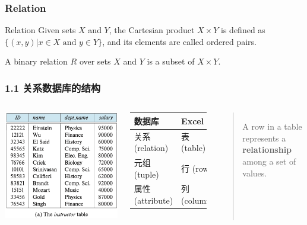 \documentclass[aspectratio=169, 14pt]{beamer}
\begin{document}
\begin{frame}
	\frametitle{Relation}

	\begin{exampleblock}{Relation}
		Given sets $X$ and $Y$, the Cartesian product $X \times Y$ is defined as $\{(x, y) | x \in X \text{ and } y \in Y\}$, and its elements are called ordered pairs.

		A \alert{binary relation} $R$ over sets $X$ and $Y$ is a subset of $X \times Y$.
	\end{exampleblock}


\end{frame}
\begin{frame}
	\frametitle{1.1 关系数据库的结构}

	\begin{columns}
		\includegraphics[width=\textwidth]{table/instructor}
		\begin{table}
			\begin{tabular}{ll}
				\toprule
				数据库                    & Excel      \\
				\midrule
				\alert{关系} (relation)  & 表 (table)  \\
				\alert{元组} (tuple)     & 行 (row)    \\
				\alert{属性} (attribute) & 列 (column) \\
				\bottomrule
			\end{tabular}
		\end{table}
		\begin{quote}
			A row in a table represents a \textbf{relationship} among a set of values.
		\end{quote}
	\end{columns}
\end{frame}
\end{document}
